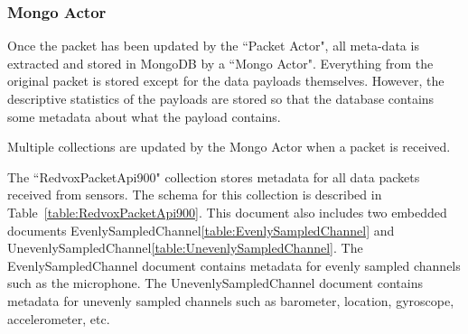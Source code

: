\subsubsection{Mongo Actor}
Once the packet has been updated by the ``Packet Actor", all meta-data is extracted and stored in MongoDB by a ``Mongo Actor". Everything from the original packet is stored except for the data payloads themselves. However, the descriptive statistics of the payloads are stored so that the database contains some metadata about what the payload contains.

Multiple collections are updated by the Mongo Actor when a packet is received.

The ``RedvoxPacketApi900" collection stores metadata for all data packets received from sensors. The schema for this collection is described in Table~\ref{table:RedvoxPacketApi900}. This document also includes two embedded documents EvenlySampledChannel\ref{table:EvenlySampledChannel} and UnevenlySampledChannel\ref{table:UnevenlySampledChannel}. The EvenlySampledChannel document contains metadata for evenly sampled channels such as the microphone. The UnevenlySampledChannel document contains metadata for unevenly sampled channels such as barometer, location, gyroscope, accelerometer, etc.

